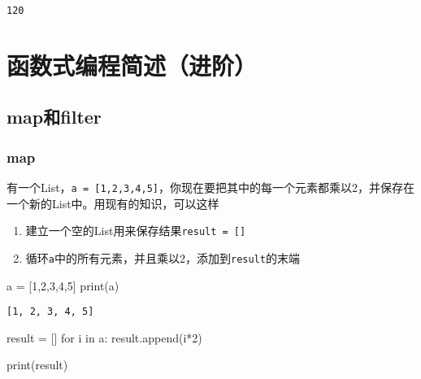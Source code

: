 \documentclass[
  letterpaper,
  DIV=11,
  numbers=noendperiod]{scrreprt}
\newenvironment{Shaded}{\begin{snugshade}}{\end{snugshade}}
\newcommand{\BuiltInTok}[1]{\textcolor[rgb]{0.00,0.23,0.31}{#1}}
\newcommand{\ControlFlowTok}[1]{\textcolor[rgb]{0.00,0.23,0.31}{#1}}
\newcommand{\DecValTok}[1]{\textcolor[rgb]{0.68,0.00,0.00}{#1}}
\newcommand{\KeywordTok}[1]{\textcolor[rgb]{0.00,0.23,0.31}{#1}}
\newcommand{\NormalTok}[1]{\textcolor[rgb]{0.00,0.23,0.31}{#1}}
\newcommand{\OperatorTok}[1]{\textcolor[rgb]{0.37,0.37,0.37}{#1}}
\providecommand{\tightlist}{%
  \setlength{\itemsep}{0pt}\setlength{\parskip}{0pt}}\usepackage{longtable,booktabs,array}
\begin{document}
\begin{verbatim}
120
\end{verbatim}

\hypertarget{ux51fdux6570ux5f0fux7f16ux7a0bux7b80ux8ff0ux8fdbux9636}{%
\chapter{函数式编程简述（进阶）}\label{ux51fdux6570ux5f0fux7f16ux7a0bux7b80ux8ff0ux8fdbux9636}}

\hypertarget{mapux548cfilter}{%
\section{map和filter}\label{mapux548cfilter}}

\hypertarget{map}{%
\subsection{map}\label{map}}

有一个List，\texttt{a\ =\ {[}1,2,3,4,5{]}}，你现在要把其中的每一个元素都乘以2，并保存在一个新的List中。用现有的知识，可以这样

\begin{enumerate}
\def\labelenumi{\arabic{enumi}.}
\tightlist
\item
  建立一个空的List用来保存结果\texttt{result\ =\ {[}{]}}
\item
  循环\texttt{a}中的所有元素，并且乘以2，添加到\texttt{result}的末端
\end{enumerate}

\begin{Shaded}
\begin{Highlighting}[]
\NormalTok{a }\OperatorTok{=}\NormalTok{ [}\DecValTok{1}\NormalTok{,}\DecValTok{2}\NormalTok{,}\DecValTok{3}\NormalTok{,}\DecValTok{4}\NormalTok{,}\DecValTok{5}\NormalTok{]}
\BuiltInTok{print}\NormalTok{(a)}
\end{Highlighting}
\end{Shaded}

\begin{verbatim}
[1, 2, 3, 4, 5]
\end{verbatim}

\begin{Shaded}
\begin{Highlighting}[]
\NormalTok{result }\OperatorTok{=}\NormalTok{ []}
\ControlFlowTok{for}\NormalTok{ i }\KeywordTok{in}\NormalTok{ a:}
\NormalTok{    result.append(i}\OperatorTok{*}\DecValTok{2}\NormalTok{)}

\BuiltInTok{print}\NormalTok{(result)}
\end{Highlighting}
\end{Shaded}
\end{document}
